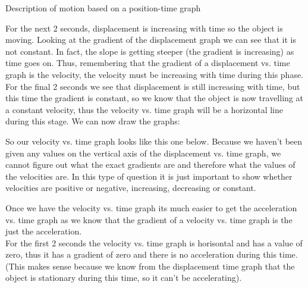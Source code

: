 \begin{wex}{Description of motion based on a position-time graph}
{
For the next 2 seconds, displacement is increasing with time so the object is moving. Looking at the gradient of the displacement graph we can see that it is not constant. In fact, the slope is getting steeper (the gradient is increasing) as time goes on. Thus, remembering that the gradient of a displacement vs. time graph is the velocity, the velocity must be increasing with time during this phase.\\

For the final 2 seconds we see that displacement is still increasing with time, but this time the gradient is constant, so we know that the object is now travelling at a constant velocity, thus the velocity vs. time graph will be a horizontal line during this stage. We can now draw the graphs:

So our velocity vs. time graph looks like this one below. Because we haven't been given any values on the vertical axis of the displacement vs. time graph, we cannot figure out what the exact gradients are and therefore what the values of the velocities are. In this type of question it is just important to show whether velocities are positive or negative, increasing, decreasing or constant.

\begin{center}
\end{center}

Once we have the velocity vs. time graph its much easier to get the acceleration vs. time graph as we know that the gradient of a velocity vs. time graph is the just the acceleration.\\

For the first 2 seconds the velocity vs. time graph is horisontal and has a value of zero, thus it has a gradient of zero and there is no acceleration during this time. (This makes sense because we know from the displacement time graph that the object is stationary during this time, so it can't be accelerating).\\

}
\end{wex}
